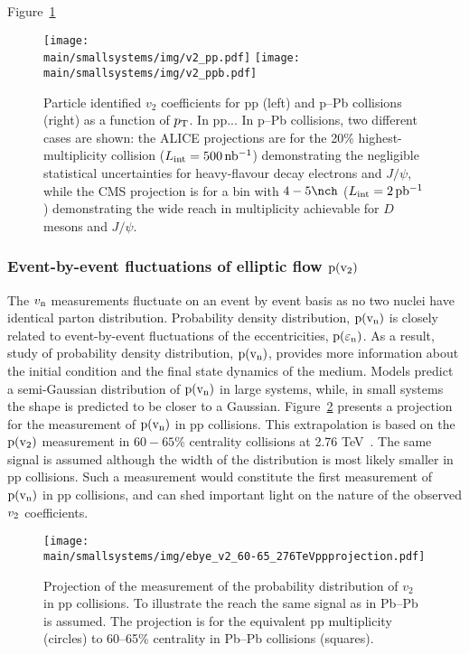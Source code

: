 \documentclass[../report.tex]{subfiles}
\providecommand{\main}{..}
\begin{document}
Figure~\ref{fig:smallsystems_corr_cumulants_pid}

\begin{figure}[ht]
\centering
\texttt{[image: \\main/smallsystems/img/v2\_pp.pdf]}
\hfill
\texttt{[image: \\main/smallsystems/img/v2\_ppb.pdf]}

\caption{Particle identified $v_2$ coefficients for pp (left) and p--Pb collisions (right) as a function of $p\sb{\scriptstyle\mathrm{T}}$. In pp... In p--Pb collisions, two different cases are shown: the ALICE projections are for the 20\% highest-multiplicity collision ($L_{\rm int} = \unit[500]{nb^{-1}}$) demonstrating the negligible statistical uncertainties for heavy-flavour decay electrons and $J/\psi$, while the CMS projection is for a bin with $4-5 \nch$ ($L_{\rm int} = \unit[2]{pb^{-1}}$) demonstrating the wide reach in multiplicity achievable for $D$ mesons and $J/\psi$.
}
\label{fig:smallsystems_corr_cumulants_pid}
\end{figure}

\subsubsection{Event-by-event fluctuations of elliptic flow $\rm{p}(v_{\rm{2}})$}

The $v_{\rm{n}}$ measurements fluctuate on an event by event basis as no two nuclei have identical parton distribution. Probability density distribution, $\rm{p}(v_{\rm{n}})$ is closely related to event-by-event fluctuations of the eccentricities, $\rm{p}(\varepsilon_{\rm{n}})$. As a result,  
study of probability density distribution, $\rm{p}(v_{\rm{n}})$,  provides more information about the initial condition and the final state dynamics of the medium. Models predict a semi-Gaussian distribution of $\rm{p}(v_{\rm{n}})$ in large systems, while, in small systems the shape is predicted to be closer to a Gaussian. Figure~\ref{fig:smallsystems_corr_pvn} presents a projection for the measurement of $\rm{p}(v_{\rm{n}})$ in pp collisions. This extrapolation is based on the $\rm{p}(v_{\rm{2}})$ measurement in $60-65\%$ centrality \PbPb{} collisions at \sqrtsNN{} 2.76 TeV~\cite{Aad:2013xma}. The same signal is assumed although the width of the distribution is most likely smaller in pp collisions. Such a measurement would constitute the first measurement of $\rm{p}(v_{\rm{n}})$ in pp collisions, and can shed important light on the nature of the observed $v_{\rm{2}}$ coefficients.

\begin{figure}[ht]
\centering
\texttt{[image: \\main/smallsystems/img/ebye\_v2\_60-65\_276TeVppprojection.pdf]}

\caption{Projection of the measurement of the probability distribution of $v_2$ in pp collisions. To illustrate the reach the same signal as in Pb--Pb~\cite{Aad:2013xma} is assumed. The projection is for the equivalent pp multiplicity (circles) to 60--65\% centrality in Pb--Pb collisions (squares).}
\label{fig:smallsystems_corr_pvn}
\end{figure}
\end{document}
